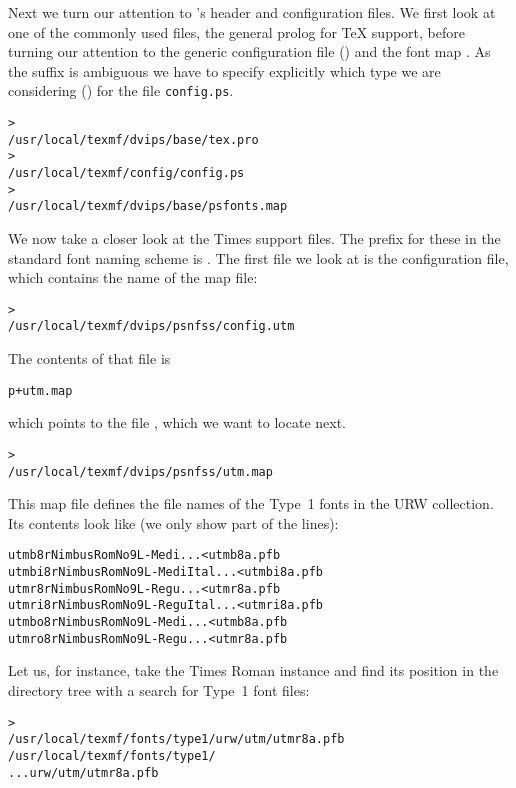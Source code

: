 \documentclass{article}
\begin{document}
\begin{multicols}{2}
Next we turn our attention to 's header and configuration
files.  We first look at one of the commonly used files, the general
prolog  for \TeX{} support, before turning our attention
to the generic configuration file () and the
\PS{} font map .  As the  suffix is
ambiguous we have to specify explicitly which type we are considering
() for the file \texttt{config.ps}.
\begin{alltt}
> 
   /usr/local/texmf/dvips/base/tex.pro
> 
   /usr/local/texmf/config/config.ps
> 
   /usr/local/texmf/dvips/base/psfonts.map
\end{alltt}

We now take a closer look at the  Times \PS{} support
files.  The prefix for these in the standard font naming scheme is
.  The first file we look at is the configuration file,
which contains the name of the map file:
\begin{alltt}
> 
/usr/local/texmf/dvips/psnfss/config.utm
\end{alltt}
The contents of that file is
\begin{alltt}
  p +utm.map
\end{alltt}
which points to the file , which we want to
locate next.
\begin{alltt}
> 
/usr/local/texmf/dvips/psnfss/utm.map
\end{alltt}
This map file defines the file names of the Type~1 \PS{} fonts in
the URW collection.  Its contents look like (we only show part of the
lines):
\begin{alltt}
utmb8r  NimbusRomNo9L-Medi    ... <utmb8a.pfb
utmbi8r NimbusRomNo9L-MediItal... <utmbi8a.pfb
utmr8r  NimbusRomNo9L-Regu    ... <utmr8a.pfb
utmri8r NimbusRomNo9L-ReguItal... <utmri8a.pfb
utmbo8r NimbusRomNo9L-Medi    ... <utmb8a.pfb
utmro8r NimbusRomNo9L-Regu    ... <utmr8a.pfb
\end{alltt}
Let us, for instance, take the Times Roman instance
 and find its position in the  directory
tree with a search for Type~1 font files:
\begin{alltt}
> 
\ifSingleColumn /usr/local/texmf/fonts/type1/urw/utm/utmr8a.pfb
\else /usr/local/texmf/fonts/type1/
...urw/utm/utmr8a.pfb
\fi\end{alltt}


\end{multicols}
\end{document}
